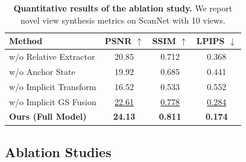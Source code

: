 \begin{table}[t]
    \centering
    \small
    \caption{\textbf{Quantitative results of the ablation study. } We report novel view synthesis metrics on ScanNet with 10 views.}
    \begin{tabular}{l|ccc}
		\toprule
		Method & PSNR $\uparrow$ & SSIM $\uparrow$ & LPIPS $\downarrow$\\
		\midrule
		w/o Relative Extractor & 20.85 & 0.712 & 0.368 \\
		w/o Anchor State & 19.92 & 0.685 & 0.441  \\
		w/o Implicit Transform & 16.52 & 0.533 & 0.552\\
		w/o Implicit GS Fusion & \underline{22.61} & \underline{0.778} & \underline{0.284} \\
		\midrule
		\textbf{Ours (Full Model)} & \textbf{24.13} & \textbf{0.811} & \textbf{0.174}  \\
      \bottomrule
    \end{tabular}
    \label{tab:ablation}
\end{table}

\subsection{Ablation Studies}


